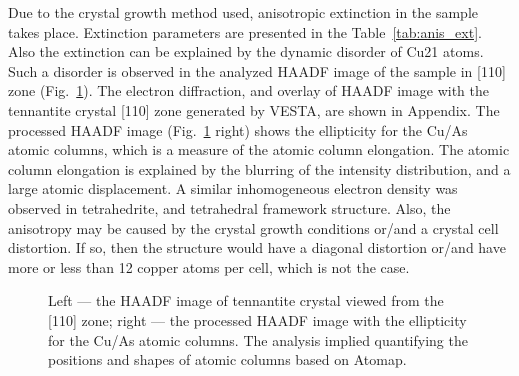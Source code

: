 \documentclass[preprint,review,12pt]{elsarticle}
\begin{document}
Due to the crystal growth method used, anisotropic extinction in the sample takes place. Extinction parameters are presented in the Table~\ref{tab:anis_ext}.
Also the extinction can be explained by the dynamic disorder of Cu21 atoms. Such a disorder is observed in the analyzed HAADF image of the sample in [110] zone (Fig.~\ref{fig:micro}).
The electron diffraction, and overlay of HAADF image with the tennantite crystal [110] zone generated by VESTA\cite{Momma2011}, are shown in Appendix.
The processed HAADF image (Fig.~\ref{fig:micro} right) shows  the ellipticity for the Cu/As atomic columns, which is a measure of the atomic column elongation\cite{Nord2017}.
The atomic column elongation is explained by the blurring of the intensity distribution, and a large atomic displacement.
A similar inhomogeneous electron density was observed in tetrahedrite\cite{Mishra2017}, and tetrahedral framework structure\cite{Suekuni2019}.
Also, the anisotropy may be caused by the crystal growth conditions or/and a crystal cell distortion.
If so, then the structure would have a diagonal distortion or/and have more or less than 12 copper atoms per cell, which is not the case.

\begin{figure}[ht]
\centering
{}
 \quad
{}
\caption{\label{fig:micro} Left --- the HAADF image of tennantite crystal viewed from the [110] zone; right --- the processed HAADF image with the ellipticity for the Cu/As atomic columns. The analysis implied quantifying the positions and shapes of atomic columns based on Atomap\cite{Nord2017}. }
\end{figure}
\end{document}
